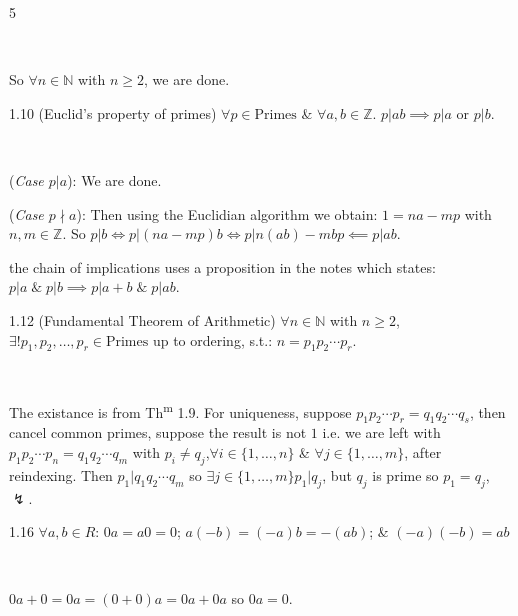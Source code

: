 \documentclass[8pt]{extarticle}
\makeatletter
\renewenvironment{proof}[1][\proofname]{%
  \pushQED{\qed}%
  \par\noindent\normalfont\itshape #1\@addpunct{.}\ \normalfont\ignorespaces
}{%
  \popQED%
  \par
}
\makeatother
\begin{document}
\begin{multicols*}{5}
\begin{proof}
            So \(\forall n\in\mathbb{N}\) with \(n\ge2\), we are done.

        \end{proof}

        \begin{theorem}{1.10}
            (Euclid's property of primes) \(\forall p\in \text{Primes}\) \& \(\forall a,b\in\mathbb{Z}\). \(p|ab\implies p|a\text{ or } p|b\).
        \end{theorem}

        \begin{proof}
            (\textit{Case \(p|a\)}): We are done.

            (\textit{Case \(p\nmid a\)}): Then using the Euclidian algorithm we obtain: \(1=na-mp\) with \(n,m\in\mathbb{Z}\).
            So \(p|b\Longleftrightarrow p|(na-mp)b\Longleftrightarrow p|n(ab)-mbp\impliedby p|ab\).
        \end{proof}

        {\footnotesize the chain of implications uses a proposition in the notes which states: \(p|a\;\&\;p|b\implies p|a+b\;\&\;p|ab\)}.

        \begin{theorem}{1.12}
            (Fundamental Theorem of Arithmetic) \(\forall n\in\mathbb{N}\) with \(n\ge2\), \(\exists! p_1,p_2,\ldots,p_r\in\text{Primes}\) up to ordering, s.t.: \(n=p_1p_2\cdots p_r\).
        \end{theorem}

        \begin{proof}
            The existance is from Th\textsuperscript{m} 1.9. For uniqueness, suppose \(p_1p_2\cdots p_r=q_1q_2\cdots q_s\), then cancel common primes, suppose the result is not \(1\) i.e. we are left with \(p_1p_2\cdots p_n=q_1q_2\cdots q_m\) with \(p_i\ne q_j\),\(\forall i\in\{1,\ldots,n\}\) \& \(\forall j\in\{1,\ldots,m\}\), after reindexing. Then \(p_1|q_1q_2\cdots q_m\) so \(\exists j\in\{1,\ldots,m\}\)\(p_1|q_j\), but \(q_j\) is prime so \(p_1=q_j\), \(\lightning\).
        \end{proof}

        \begin{lemma}{1.16}
            \(\forall a,b\in R\): \(0a=a0=0\); \(a(-b)=(-a)b=-(ab)\); \& \((-a)(-b)=ab\)
        \end{lemma}

        \begin{proof}
            \(0a+0=0a=(0+0)a=0a+0a\) so \(0a=0\).
            

\end{proof}
\end{multicols*}
\end{document}
